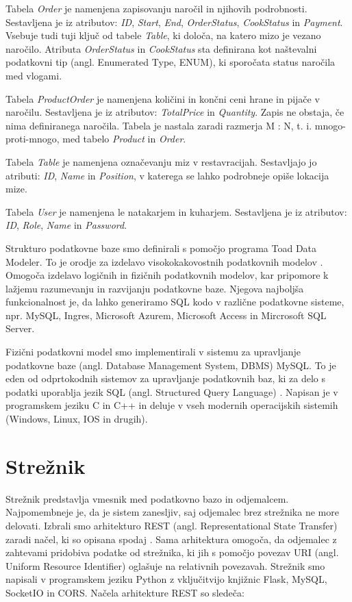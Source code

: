 \documentclass[a4paper, 12pt]{book}
\begin{document}
Tabela \textit{Order} je namenjena zapisovanju naročil in njihovih podrobnosti. Sestavljena je iz atributov: \textit{ID}, \textit{Start}, \textit{End}, \textit{OrderStatus}, \textit{CookStatus} in \textit{Payment}. Vsebuje tudi tuji ključ od tabele \textit{Table}, ki določa, na katero mizo je vezano naročilo. Atributa \textit{OrderStatus} in \textit{CookStatus} sta definirana kot naštevalni podatkovni tip (angl. Enumerated Type, ENUM), ki sporočata status naročila med vlogami.

Tabela \textit{ProductOrder} je namenjena količini in končni ceni hrane in pijače v naročilu. Sestavljena je iz atributov: \textit{TotalPrice} in \textit{Quantity}. Zapis ne obstaja, če nima definiranega naročila. Tabela je nastala zaradi razmerja M : N, t. i. mnogo-proti-mnogo, med tabelo \textit{Product} in \textit{Order}.

Tabela \textit{Table} je namenjena označevanju miz v restavracijah. Sestavljajo jo atributi: \textit{ID}, \textit{Name} in \textit{Position}, v katerega se lahko podrobneje opiše lokacija mize.

Tabela \textit{User} je namenjena le natakarjem in kuharjem. Sestavljena je iz atributov: \textit{ID}, \textit{Role}, \textit{Name} in \textit{Password}. 

Strukturo podatkovne baze smo definirali s pomočjo programa Toad Data Modeler. To je orodje za izdelavo visokokakovostnih podatkovnih modelov \cite{Toad_Data_Modeler}. Omogoča izdelavo logičnih in fizičnih podatkovnih modelov, kar pripomore k lažjemu razumevanju in razvijanju podatkovne baze. Njegova najboljša funkcionalnost je, da lahko generiramo SQL kodo v različne podatkovne sisteme, npr. MySQL, Ingres, Microsoft Azurem, Microsoft Access in Mircrosoft SQL Server.

Fizični podatkovni model smo implementirali v sistemu za upravljanje podatkovne baze (angl. Database Management System, DBMS) MySQL. To je eden od odprtokodnih sistemov za upravljanje podatkovnih baz, ki za delo s podatki uporablja jezik SQL (angl. Structured Query Language) \cite{MySQL}. Napisan je v programskem jeziku C in C++ in deluje v vseh modernih operacijskih sistemih (Windows, Linux, IOS in drugih).


\section{Strežnik}
Strežnik predstavlja vmesnik med podatkovno bazo in odjemalcem. Najpomembneje je, da je sistem zanesljiv, saj odjemalec brez strežnika ne more delovati. Izbrali smo arhitekturo REST (angl. Representational State Transfer) zaradi načel, ki so opisana spodaj \cite{RESTAPI}. Sama arhitektura omogoča, da odjemalec z zahtevami pridobiva podatke od strežnika, ki jih s pomočjo povezav URI (angl. Uniform Resource Identifier) oglašuje na relativnih povezavah. Strežnik smo napisali v programskem jeziku Python z vključitvijo knjižnic Flask, MySQL, SocketIO in CORS. Načela arhitekture REST so sledeča:
\end{document}
